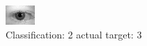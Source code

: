 \begin{figure}[h!]
\begin{center}
\includegraphics[width=0.60\columnwidth]{figures/ID529_class_2_target_3.png}
\end{center}
\caption{ Classification: 2 actual target: 3}
\label{fig:ID529_class_2_target_3}
\end{figure}
